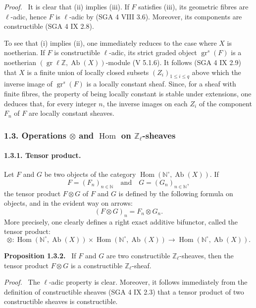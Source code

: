 \documentclass[11pt]{article}
\newenvironment{statement}[1]{\par\medskip\noindent\textbf{#1.}\ }{\par\medskip}
\newenvironment{prooftext}[1][Proof]{\par\noindent\emph{#1.}\ }{\par\medskip}
\DeclareMathOperator{\Hom}{Hom}
\providecommand{\Hom}{\operatorname{Hom}}
\providecommand{\Ab}{\operatorname{Ab}}
\begin{document}
\begin{prooftext}[Proof]
It is clear that (ii) implies (iii). If \(F\) satisfies (iii), its geometric fibres are \(\ell\)-adic, hence \(F\) is \(\ell\)-adic by (SGA 4 VIII 3.6). Moreover, its components are constructible (SGA 4 IX 2.8).

To see that (i) implies (ii), one immediately reduces to the case where \(X\) is noetherian. If \(F\) is constructible \(\ell\)-adic, its strict graded object \(\operatorname{gr}^s(F)\) is a noetherian \((\operatorname{gr}\ell\mathbb Z,\Ab(X))\)-module (V 5.1.6). It follows (SGA 4 IX 2.9) that \(X\) is a finite union of locally closed subsets \((Z_i)_{1\le i\le q}\) above which the inverse image of \(\operatorname{gr}^s(F)\) is a locally constant sheaf. Since, for a sheaf with finite fibres, the property of being locally constant is stable under extensions, one deduces that, for every integer \(n\), the inverse images on each \(Z_i\) of the component \(F_n\) of \(F\) are locally constant sheaves.
\end{prooftext}

\subsubsection*{1.3. Operations \(\otimes\) and \(\Hom\) on \(\mathbb Z_\ell\)-sheaves}

\paragraph{1.3.1. Tensor product.}
Let \(F\) and \(G\) be two objects of the category \(\Hom(\mathbb N^\circ,\Ab(X))\). If
\[
F=(F_n)_{n\in\mathbb N}\quad\text{and}\quad G=(G_n)_{n\in\mathbb N},
\]
the tensor product \(F\otimes G\) of \(F\) and \(G\) is defined by the following formula on objects, and in the evident way on arrows:
\[
(F\otimes G)_n=F_n\otimes G_n.
\]
More precisely, one clearly defines a right exact additive bifunctor, called the tensor product:
\[
\otimes:\Hom(\mathbb N^\circ,\Ab(X))\times \Hom(\mathbb N^\circ,\Ab(X))
\longrightarrow \Hom(\mathbb N^\circ,\Ab(X)).
\]

\begin{statement}{Proposition 1.3.2}
If \(F\) and \(G\) are two constructible \(\mathbb Z_\ell\)-sheaves, then the tensor product \(F\otimes G\) is a constructible \(\mathbb Z_\ell\)-sheaf.
\end{statement}

\begin{prooftext}[Proof]
The \(\ell\)-adic property is clear. Moreover, it follows immediately from the definition of constructible sheaves (SGA 4 IX 2.3) that a tensor product of two constructible sheaves is constructible.
\end{prooftext}
\end{document}
